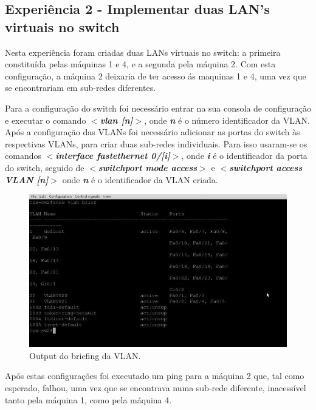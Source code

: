 \documentclass[a4paper]{article}
\begin{document}
\subsection{Experiência 2 - Implementar duas LAN's virtuais no switch}
Nesta experiência foram criadas duas LANs virtuais no switch: a primeira constituída pelas máquinas 1 e 4, e a segunda pela máquina 2. Com esta configuração, a máquina 2 deixaria de ter acesso ás maquinas 1 e 4, uma vez que se encontrariam em sub-redes diferentes.

Para a configuração do switch foi necessário entrar na sua consola de configuração e executar o comando \textbf{\textit{$<$vlan [n]$>$}}, onde \textbf{\textit{n}} é o número identificador da VLAN. Após a configuração das VLANs foi necessário adicionar as portas do switch às respectivas VLANs, para criar duas sub-redes individuais. Para isso usaram-se os comandos \textbf{\textit{$<$interface fastethernet 0/[i]$>$}}, onde \textbf{\textit{i}} é o identificador da porta do switch, seguido de \textbf{\textit{$<$switchport mode access$>$}} e \textbf{\textit{$<$switchport access VLAN [n]$>$}} onde \textit{\textbf{n}} é o identificador da VLAN criada.

\begin{figure}[h!]
\centering
\includegraphics[scale=0.3]{res/image3.jpg}
\caption{Output do briefing da VLAN.}
\end{figure}

Após estas configurações foi executado um ping para a máquina 2 que, tal como esperado, falhou, uma vez que se encontrava numa sub-rede diferente, inacessível tanto pela máquina 1, como pela máquina 4.
\end{document}
